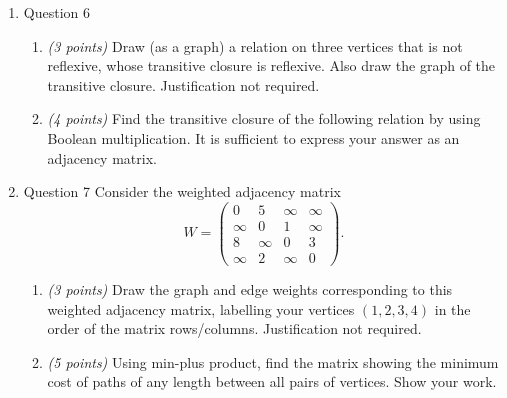 \documentclass{amsart}
\begin{document}
\begin{enumerate}
\begin{enumerate}
\item \emph{(3 points)} Find an integer \(x\) such that \(0 \leq x \leq 14\), with \([-31] = [x]\). Justify briefly.

\item \emph{(3 points)}
Consider the equation \([4] -  [x] = [21]\).
Is there an integer \(x\) that satisfies this equation?
If not, justify why.
If yes, find a positive integer that satisfies this, showing your work.

\item \emph{(3 points)}
Consider the equation \([2]\cdot [x] = [7]\). Find a positive integer that satisfies this, showing your work.
\end{enumerate}
\item Question 6
\label{sec:orgfdb5462}
\begin{enumerate}
\item \emph{(3 points)} Draw (as a graph) a relation on three vertices that is not reflexive, whose transitive closure is reflexive.
Also draw the graph of the transitive closure.
Justification not required.

\item \emph{(4 points)} Find the transitive closure of the following relation by using Boolean multiplication. It is sufficient to express your answer as an adjacency matrix.
\begin{center}

\label{orga86d1b4}
\end{center}
\end{enumerate}
\item Question 7
\label{sec:orgcdcd773}
Consider the weighted adjacency matrix
\[W =\begin{pmatrix}
  0  &  5  &  \infty  &  \infty \\
  \infty  &  0  &  1  &  \infty \\
  8  &  \infty  &  0  &  3 \\
  \infty  &  2  &  \infty  &  0 
\end{pmatrix}.\]
\begin{enumerate}
\item \emph{(3 points)} Draw the graph and edge weights corresponding to this weighted adjacency matrix, labelling your vertices \((1,2,3,4)\) in the order of the matrix rows/columns. Justification not required.

\item \emph{(5 points)} Using min-plus product, find the matrix showing the minimum cost of paths of any length between all pairs of vertices.
Show your work.
\end{enumerate}
\end{enumerate}
\end{document}
